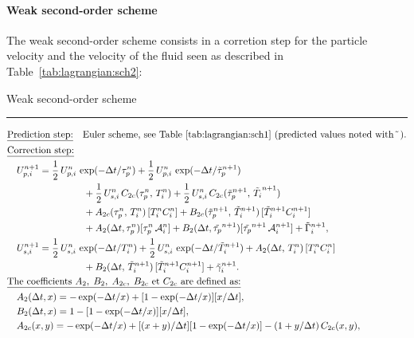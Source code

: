\paragraph{Weak second-order scheme} The weak second-order scheme consists in a corretion step for the particle velocity and the velocity of the fluid seen as described in Table~\ref{tab:lagrangian:sch2}:
\begin{table}[htbp]
\caption{Weak second-order scheme}
\hrule
\begin{align}
& \text{\underline{Prediction step:}}
\quad \text{Euler scheme, see Table \ref{tab:lagrangian:sch1} (predicted values noted with $\tilde{ }$ )} .\notag \\
& \text{\underline{Correction step:}} \notag \\
& \quad U_{p,i}^{n+1} =
    \frac{1}{2}\,U_{p,i}^n\, \exp(-\Delta t/\tau_p^n)
  + \frac{1}{2}\,U_{p,i}^n\,\exp(-\Delta t/\tilde{\tau }_p^{n+1})\notag \\
& \qquad \qquad \qquad \qquad + \frac{1}{2}\,U_{s,i}^n\,C_{2c}(\tau_p^n,\,T_i^n)
  + \frac{1}{2}\,U_{s,i}^n\,C_{2c}(\tilde{\tau}_p^{n+1},\,\tilde{T_i}^{n+1})
\notag \\
& \qquad \qquad \qquad \qquad + A_{2c}(\tau_p^n,\,T_i^n) \,[T_i^n C_i^n]
  + B_{2c}(\tilde{\tau}_p^{n+1},\,\tilde{T}_i^{n+1})\,[\tilde{T}_i^{n+1} C_i^{n+1}]\notag \\
& \qquad \qquad \qquad \qquad + A_2(\Delta t,\tau_p^n)[\tau_p^n\,{\cal A}_i^n]
  + B_2(\Delta t,\tilde{\tau_p}^{n+1})[\tilde{\tau_p}^{n+1}\,{\cal A}_i^{n+1}]
  + \tilde{\Gamma}_i^{n+1}, \notag \\
& \quad U_{s,i}^{n+1} = \frac{1}{2}\,U_{s,i}^n\,\exp(-\Delta t/T_i^n)
+ \frac{1}{2}\,U_{s,i}^{n}\,\exp(-\Delta t/\tilde{T}_i^{n+1})
+ A_2(\Delta t,\,T_i^n) \,[T_i^n C_i^n]\notag \\
& \qquad \qquad \qquad \qquad
+ B_2(\Delta t,\,\tilde{T}_i^{n+1}) \,[\tilde{T}_i^{n+1} C_i^{n+1}]
+ \tilde{\gamma}_i^{n+1}.\notag\\
& \text{\underline{The coefficients $A_2,\;B_2,\;A_{2c},\;B_{2c}$ et $C_{2c}$ are
  defined as:}}\notag \\
& \quad A_2(\Delta t,x) = -\exp(-\Delta t/x)
+ [1-\exp(-\Delta t/x)][x/\Delta t], \notag\\
& \quad B_2(\Delta t,x) = 1-[1-\exp(-\Delta t/x)][x/\Delta t],\notag \\
& \quad A_{2c}(x,y) =
- \exp(-\Delta t/x) + [(x+y)/\Delta t][1-\exp(-\Delta t/x)]
- (1+y/\Delta t)\,C_{2c}(x,y), \notag \\

\end{align}
\end{table}
